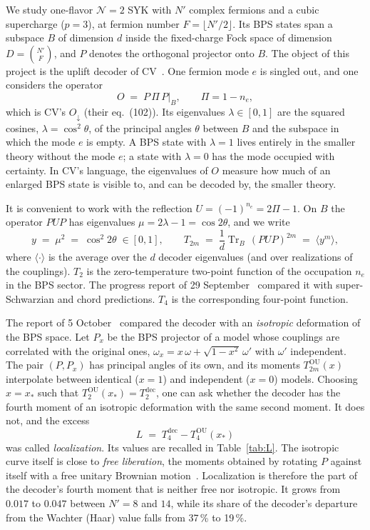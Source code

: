 \documentclass[11pt]{article}
\newcommand{\Tr}{\operatorname{Tr}}
\newcommand{\Np}{N'}
\newcommand{\dec}{\mathrm{dec}}
\newcommand{\OU}{\mathrm{OU}}
\theoremstyle{plain}
\theoremstyle{remark}
\numberwithin{equation}{section}
\begin{document}
We study one-flavor $\mathcal N=2$ SYK with $\Np$ complex fermions and a cubic supercharge ($p=3$), at fermion number
$F=\lfloor \Np/2\rfloor$. Its BPS states span a subspace $B$ of dimension $d$ inside the fixed-charge Fock space of
dimension $D=\binom{\Np}{F}$, and $P$ denotes the orthogonal projector onto $B$. The object of this project is the
uplift decoder of CV~\cite{CV}. One fermion mode $e$ is singled out, and one considers the operator
\begin{equation}\label{eq:decoder}
O \;=\; P\,\Pi\,P\big|_B,\qquad \Pi = 1-n_e ,
\end{equation}
which is CV's $O_\downarrow$ (their eq.~(102)). Its eigenvalues $\lambda\in[0,1]$ are the squared cosines,
$\lambda=\cos^2\theta$, of the principal angles $\theta$ between $B$ and the subspace in which the mode $e$ is empty. A BPS
state with $\lambda=1$ lives entirely in the smaller theory without the mode $e$; a state with $\lambda=0$ has the mode
occupied with certainty. In CV's language, the eigenvalues of $O$ measure how much of an enlarged BPS state is visible
to, and can be decoded by, the smaller theory.

It is convenient to work with the reflection $U=(-1)^{n_e}=2\Pi-1$. On $B$ the operator $PUP$ has eigenvalues
$\mu=2\lambda-1=\cos2\theta$, and we write
\begin{equation}\label{eq:y}
y \;=\; \mu^2 \;=\; \cos^2 2\theta\;\in[0,1],\qquad
T_{2m} \;=\; \frac1d\Tr_B\,(PUP)^{2m} \;=\; \langle y^m\rangle ,
\end{equation}
where $\langle\cdot\rangle$ is the average over the $d$ decoder eigenvalues (and over realizations of the couplings).
$T_2$ is the zero-temperature two-point function of the occupation $n_e$ in the BPS sector. The progress report of 29
September~\cite{prog0929} compared it with super-Schwarzian and chord predictions. $T_4$ is the corresponding
four-point function.

The report of 5 October~\cite{prog1005} compared the decoder with an \emph{isotropic} deformation of the BPS space. Let
$P_x$ be the BPS projector of a model whose couplings are correlated with the original ones,
$\omega_x=x\,\omega+\sqrt{1-x^2}\,\omega'$ with $\omega'$ independent. The pair $(P,P_x)$ has principal angles of its
own, and its moments $T^\OU_{2m}(x)$ interpolate between identical ($x=1$) and independent ($x=0$) models. Choosing
$x=x_*$ such that $T_2^\OU(x_*)=T_2^\dec$, one can ask whether the decoder has the fourth moment of an isotropic
deformation with the same second moment. It does not, and the excess
\begin{equation}\label{eq:L}
L \;=\; T_4^\dec-T_4^\OU(x_*)
\end{equation}
was called \emph{localization}. Its values are recalled in Table~\ref{tab:L}. The isotropic curve itself is close to
\emph{free liberation}, the moments obtained by rotating $P$ against itself with a free unitary Brownian
motion~\cite{DHH}. Localization is therefore the part of the decoder's fourth moment that is neither free nor
isotropic. It grows from $0.017$ to $0.047$ between $\Np=8$ and $14$, while its share of the decoder's departure from
the Wachter (Haar) value falls from 37\,\% to 19\,\%.
\end{document}
